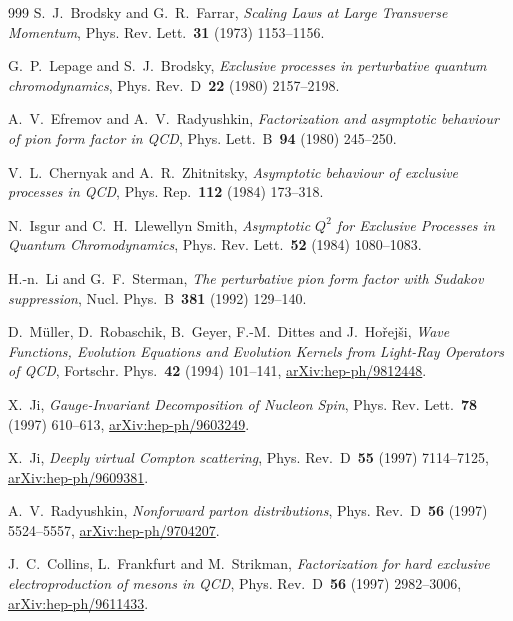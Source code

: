 \begin{thebibliography}{999}
S.~J.~Brodsky and G.~R.~Farrar, \emph{Scaling Laws at Large Transverse Momentum}, Phys. Rev. Lett.~\textbf{31} (1973) \mbox{1153--1156}.

G.~P.~Lepage and S.~J.~Brodsky, \emph{Exclusive processes in perturbative quantum chromodynamics}, Phys. Rev.~D~\textbf{22} (1980) \mbox{2157--2198}.

A.~V.~Efremov and A.~V.~Radyushkin, \emph{Factorization and asymptotic behaviour of pion form factor in QCD}, Phys. Lett.~B~\textbf{94} (1980) \mbox{245--250}.

V.~L.~Chernyak and A.~R.~Zhitnitsky, \emph{Asymptotic behaviour of exclusive processes in QCD}, Phys. Rep.~\textbf{112} (1984) \mbox{173--318}.

N.~Isgur and C.~H.~Llewellyn Smith, \emph{Asymptotic $Q^2$ for Exclusive Processes in Quantum Chromodynamics}, Phys. Rev. Lett.~\textbf{52} (1984) \mbox{1080--1083}.

H.-n.~Li and G.~F.~Sterman, \emph{The perturbative pion form factor with Sudakov suppression}, Nucl. Phys.~B~\textbf{381} (1992) \mbox{129--140}.

D.~Müller, D.~Robaschik, B.~Geyer, F.-M.~Dittes and J.~Hořejši, \emph{Wave Functions, Evolution Equations and Evolution Kernels from Light-Ray Operators of QCD}, Fortschr. Phys.~\textbf{42} (1994) \mbox{101--141}, \href{https://arxiv.org/abs/hep-ph/9812448}{arXiv:hep-ph/9812448}.

X.~Ji, \emph{Gauge-Invariant Decomposition of Nucleon Spin}, Phys. Rev. Lett.~\textbf{78} (1997) \mbox{610--613}, \href{https://arxiv.org/abs/hep-ph/9603249}{arXiv:hep-ph/9603249}.

X.~Ji, \emph{Deeply virtual Compton scattering}, Phys. Rev.~D~\textbf{55} (1997) \mbox{7114--7125}, \href{https://arxiv.org/abs/hep-ph/9609381}{arXiv:hep-ph/9609381}.

A.~V.~Radyushkin, \emph{Nonforward parton distributions}, Phys. Rev.~D~\textbf{56} (1997) \mbox{5524--5557}, \href{https://arxiv.org/abs/hep-ph/9704207}{arXiv:hep-ph/9704207}.

J.~C.~Collins, L.~Frankfurt and M.~Strikman, \emph{Factorization for hard exclusive electroproduction of mesons in QCD}, Phys. Rev.~D~\textbf{56} (1997) \mbox{2982--3006}, \href{https://arxiv.org/abs/hep-ph/9611433}{arXiv:hep-ph/9611433}.


\end{thebibliography}
